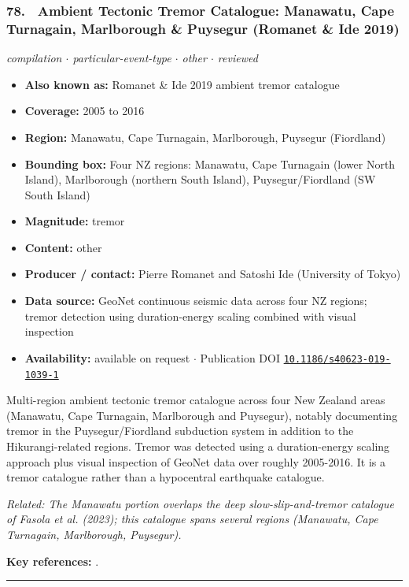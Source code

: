 \documentclass[10pt,a4paper]{article}
\newcommand{\catentryrule}{\par\vspace{3pt}\noindent\textcolor{rulegrey}{\rule{\linewidth}{0.3pt}}\par\vspace{5pt}}
\newcommand{\kv}[2]{\item \textbf{#1:} #2}
\begin{document}
\subsubsection*{\hypertarget{c:78}{78.}~ Ambient Tectonic Tremor Catalogue: Manawatu, Cape Turnagain, Marlborough \& Puysegur (Romanet \& Ide 2019)}
{\small\itshape compilation $\cdot$ particular-event-type $\cdot$ other $\cdot$ reviewed}\par\vspace{2pt}
\begin{itemize}[leftmargin=1.3em,itemsep=0.6pt,topsep=1pt,parsep=0pt]
\kv{Also known as}{Romanet \& Ide 2019 ambient tremor catalogue}
\kv{Coverage}{2005 to 2016}
\kv{Region}{Manawatu, Cape Turnagain, Marlborough, Puysegur (Fiordland)}
\kv{Bounding box}{Four NZ regions: Manawatu, Cape Turnagain (lower North Island), Marlborough (northern South Island), Puysegur/Fiordland (SW South Island)}
\kv{Magnitude}{tremor}
\kv{Content}{other}
\kv{Producer / contact}{Pierre Romanet and Satoshi Ide (University of Tokyo)}
\kv{Data source}{GeoNet continuous seismic data across four NZ regions; tremor detection using duration-energy scaling combined with visual inspection}
\kv{Availability}{available on request $\cdot$ Publication DOI \href{https://doi.org/10.1186/s40623-019-1039-1}{\nolinkurl{10.1186/s40623-019-1039-1}}}
\end{itemize}
\par\vspace{2pt}Multi-region ambient tectonic tremor catalogue across four New Zealand areas (Manawatu, Cape Turnagain, Marlborough and Puysegur), notably documenting tremor in the Puysegur/Fiordland subduction system in addition to the Hikurangi-related regions. Tremor was detected using a duration-energy scaling approach plus visual inspection of GeoNet data over roughly 2005-2016. It is a tremor catalogue rather than a hypocentral earthquake catalogue.
\par{\small\itshape Related: The Manawatu portion overlaps the deep slow-slip-and-tremor catalogue of Fasola et al. (2023); this catalogue spans several regions (Manawatu, Cape Turnagain, Marlborough, Puysegur).}
\par\vspace{2pt}\textbf{Key references:} \cite{Romanet2019}.
\catentryrule
\end{document}
